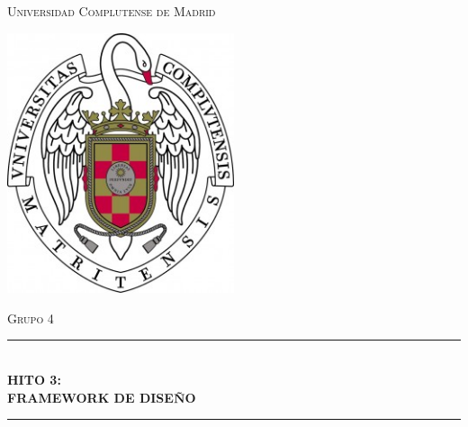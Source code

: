 \documentclass[12pt]{article}
\begin{document}
\begin{titlepage}

\newcommand{\HRule}{\rule{\linewidth}{0.5mm}} 

\center %
 
 

\textsc{\LARGE Universidad Complutense de Madrid}\\[0.1cm] %

\begin{center}
	\centering
	\includegraphics[width=0.5\textwidth]{logo}
\end{center}
 
 

\textsc{\LARGE Grupo 4}\\[0.1cm] %



\HRule \\[0.4cm]
{ \huge \bfseries HITO 3: }\\[0.4cm] %
{ \huge \bfseries FRAMEWORK DE DISEÑO }\\[0.2cm] %
\HRule \\[1.2cm]
 

\end{titlepage}
\end{document}
